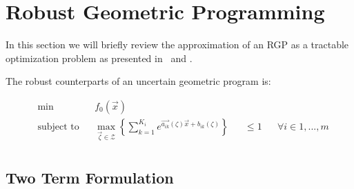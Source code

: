 \section{Robust Geometric Programming} \label{RGP}
In this section we will briefly review the approximation of an RGP as a tractable optimization problem as presented in~\cite{Saab2018} and \cite{hsiung_kim_boyd_2007}.

The robust counterparts of an uncertain geometric program is:

\begin{equation}
\begin{aligned}
& \min &&f_0\left(\vec{x}\right)\\
& \text{subject to} &&\max_{\vec{\zeta} \in \mathcal{Z}} \left\{\textstyle{\sum}_{k=1}^{K_i}e^{\vec{a_{ik}}\left(\zeta\right)\vec{x} + b_{ik}\left(\zeta\right)}\right\} &&\leq 1 &&\forall i \in 1,...,m\\
\end{aligned}
\label{GP_counterparts_finite}
\end{equation}

\subsection{Two Term Formulation}
